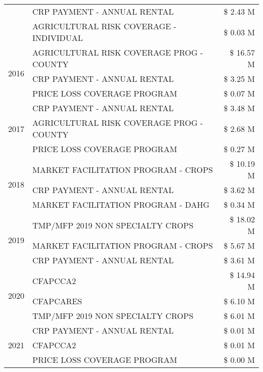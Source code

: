 \begin{tabular}{llr}
 & CRP PAYMENT - ANNUAL RENTAL & \$ 2.43 M \\
 & AGRICULTURAL RISK COVERAGE - INDIVIDUAL & \$ 0.03 M \\
\cline{1-3}
\multirow[t]{3}{*}{2016} & AGRICULTURAL RISK COVERAGE PROG - COUNTY & \$ 16.57 M \\
 & CRP PAYMENT - ANNUAL RENTAL & \$ 3.25 M \\
 & PRICE LOSS COVERAGE PROGRAM & \$ 0.07 M \\
\cline{1-3}
\multirow[t]{3}{*}{2017} & CRP PAYMENT - ANNUAL RENTAL & \$ 3.48 M \\
 & AGRICULTURAL RISK COVERAGE PROG - COUNTY & \$ 2.68 M \\
 & PRICE LOSS COVERAGE PROGRAM & \$ 0.27 M \\
\cline{1-3}
\multirow[t]{3}{*}{2018} & MARKET FACILITATION PROGRAM - CROPS & \$ 10.19 M \\
 & CRP PAYMENT - ANNUAL RENTAL & \$ 3.62 M \\
 & MARKET FACILITATION PROGRAM - DAHG & \$ 0.34 M \\
\cline{1-3}
\multirow[t]{3}{*}{2019} & TMP/MFP 2019 NON SPECIALTY CROPS & \$ 18.02 M \\
 & MARKET FACILITATION PROGRAM - CROPS & \$ 5.67 M \\
 & CRP PAYMENT - ANNUAL RENTAL & \$ 3.61 M \\
\cline{1-3}
\multirow[t]{3}{*}{2020} & CFAPCCA2 & \$ 14.94 M \\
 & CFAPCARES & \$ 6.10 M \\
 & TMP/MFP 2019 NON SPECIALTY CROPS & \$ 6.01 M \\
\cline{1-3}
\multirow[t]{3}{*}{2021} & CRP PAYMENT - ANNUAL RENTAL & \$ 0.01 M \\
 & CFAPCCA2 & \$ 0.01 M \\
 & PRICE LOSS COVERAGE PROGRAM & \$ 0.00 M \\
\cline{1-3}
\bottomrule
\end{tabular}

